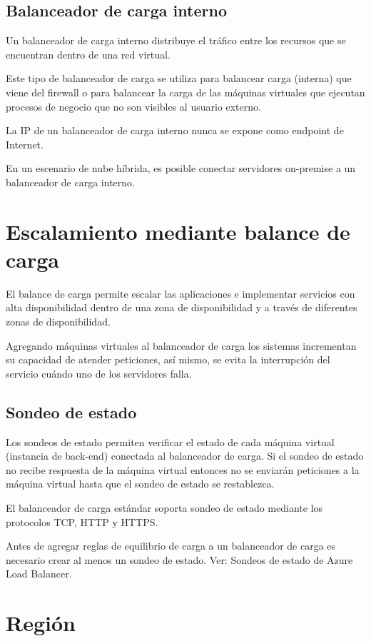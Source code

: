 \subsection{Balanceador de carga interno}

Un balanceador de carga interno distribuye el tráfico entre los recursos que se encuentran dentro de una red virtual.

Este tipo de balanceador de carga se utiliza para balancear carga (interna) que viene del firewall o para balancear la carga de las máquinas virtuales que ejecutan procesos de negocio que no son visibles al usuario externo.

La IP de un balanceador de carga interno nunca se expone como endpoint de Internet.

En un escenario de nube híbrida, es posible conectar servidores on-premise a un balanceador de carga interno.

\section{Escalamiento mediante balance de carga}

El balance de carga permite escalar las aplicaciones e implementar servicios con alta disponibilidad dentro de una zona de disponibilidad y a través de diferentes zonas de disponibilidad.

Agregando máquinas virtuales al balanceador de carga los sistemas incrementan su capacidad de atender peticiones, así mismo, se evita la interrupción del servicio cuándo uno de los servidores falla.

\subsection{Sondeo de estado}

Los sondeos de estado permiten verificar el estado de cada máquina virtual (instancia de back-end) conectada al balanceador de carga. Si el sondeo de estado no recibe respuesta de la máquina virtual entonces no se enviarán peticiones a la máquina virtual hasta que el sondeo de estado se restablezca.

El balanceador de carga estándar soporta sondeo de estado mediante los protocolos TCP, HTTP y HTTPS.

Antes de agregar reglas de equilibrio de carga a un balanceador de carga es necesario crear al menos un sondeo de estado. Ver: Sondeos de estado de Azure Load Balancer.

\section{Región}


